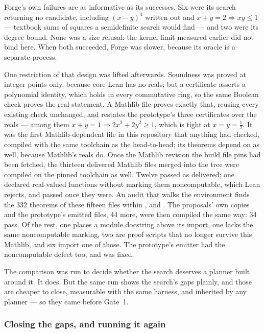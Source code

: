 Forge's own failures are as informative as its successes. Six were its search
returning no candidate, including $(x-y)^4$ written out and $x+y=2 \Rightarrow xy
\le 1$ --- textbook sums of squares a semidefinite search would find --- and two
were its degree bound. None was a size refusal: the kernel limit measured earlier
did not bind here. When both succeeded, Forge was slower, because its oracle is a
separate process.

One restriction of that design was lifted afterwards. Soundness was proved at
integer points only, because core Lean has no reals; but a certificate asserts a
polynomial identity, which holds in every commutative ring, so the same Boolean
check proves the real statement. A Mathlib file proves exactly that, reusing
every existing check unchanged, and restates the prototype's three certificates
over the reals --- among them $x + y = 1 \Rightarrow 2x^2 + 2y^2 \ge 1$, which is
tight at $x = y = \tfrac12$. It was the first Mathlib-dependent file in this
repository that anything had checked, compiled with the same toolchain as the
head-to-head; its theorems depend on  as well, because
Mathlib's reals do. Once the Mathlib revision the build file pins had been
fetched, the thirteen delivered Mathlib files merged into the tree were compiled
on the pinned toolchain as well. Twelve passed as delivered; one declared
real-valued functions without marking them noncomputable, which Lean rejects,
and passed once they were. An audit that walks the environment finds the 332
theorems of these fifteen files within , 
and . The proposals' own copies and the prototype's emitted
files, 44 more, were then compiled the same way: 34 pass. Of the rest, one
places a module docstring above its import, one lacks the same
noncomputable marking, two are proof scripts that no longer survive this
Mathlib, and six import one of those. The prototype's emitter had the
noncomputable defect too, and was fixed.

The comparison was run to decide whether the search deserves a planner built
around it. It does. But the same run shows the search's gaps plainly, and those
are cheaper to close, measurable with the same harness, and inherited by any
planner --- so they came before Gate~1.

\subsubsection*{Closing the gaps, and running it again}

